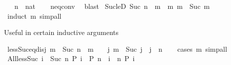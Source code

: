 \begin{isabellebody}
\ \ \ n\ {\isacharcolon}{\kern0pt}{\isacharcolon}{\kern0pt}\ nat\isanewline
%
\isadelimproof
\ \ %
\endisadelimproof
%
\isatagproof
{}\isamarkupfalse%
\ neq{}{\isacharunderscore}{\kern0pt}conv\ \isamarkupfalse%
\ blast%
\endisatagproof
{\isafoldproof}%
%
\isadelimproof
\isanewline
%
\endisadelimproof
\isanewline
{}\isamarkupfalse%
\ Suc{\isacharunderscore}{\kern0pt}le{\isacharunderscore}{\kern0pt}D{\isacharcolon}{\kern0pt}\ {\isachardoublequoteopen}Suc\ n\ {\isasymle}\ m{\isacharprime}{\kern0pt}\ {\isasymLongrightarrow}\ {\isasymexists}m{\isachardot}{\kern0pt}\ m{\isacharprime}{\kern0pt}\ {\isacharequal}{\kern0pt}\ Suc\ m{\isachardoublequoteclose}\isanewline
%
\isadelimproof
\ \ %
\endisadelimproof
%
\isatagproof
{}\isamarkupfalse%
\ {\isacharparenleft}{\kern0pt}induct\ m{\isacharprime}{\kern0pt}{\isacharparenright}{\kern0pt}\ simp{\isacharunderscore}{\kern0pt}all%
\endisatagproof
{\isafoldproof}%
%
\isadelimproof
%
\endisadelimproof
%
\begin{isamarkuptext}%
Useful in certain inductive arguments%
\end{isamarkuptext}\isamarkuptrue%
\isamarkupfalse%
\ less{\isacharunderscore}{\kern0pt}Suc{\isacharunderscore}{\kern0pt}eq{\isacharunderscore}{\kern0pt}{}{\isacharunderscore}{\kern0pt}disj{\isacharcolon}{\kern0pt}\ {\isachardoublequoteopen}m\ {\isacharless}{\kern0pt}\ Suc\ n\ {\isasymlongleftrightarrow}\ m\ {\isacharequal}{\kern0pt}\ {}\ {\isasymor}\ {\isacharparenleft}{\kern0pt}{\isasymexists}j{\isachardot}{\kern0pt}\ m\ {\isacharequal}{\kern0pt}\ Suc\ j\ {\isasymand}\ j\ {\isacharless}{\kern0pt}\ n{\isacharparenright}{\kern0pt}{\isachardoublequoteclose}\isanewline
%
\isadelimproof
\ \ %
\endisadelimproof
%
\isatagproof
{}\isamarkupfalse%
\ {\isacharparenleft}{\kern0pt}cases\ m{\isacharparenright}{\kern0pt}\ simp{\isacharunderscore}{\kern0pt}all%
\endisatagproof
{\isafoldproof}%
%
\isadelimproof
\isanewline
%
\endisadelimproof
\isanewline
{}\isamarkupfalse%
\ All{\isacharunderscore}{\kern0pt}less{\isacharunderscore}{\kern0pt}Suc{\isacharcolon}{\kern0pt}\ {\isachardoublequoteopen}{\isacharparenleft}{\kern0pt}{\isasymforall}i\ {\isacharless}{\kern0pt}\ Suc\ n{\isachardot}{\kern0pt}\ P\ i{\isacharparenright}{\kern0pt}\ {\isacharequal}{\kern0pt}\ {\isacharparenleft}{\kern0pt}P\ n\ {\isasymand}\ {\isacharparenleft}{\kern0pt}{\isasymforall}i\ {\isacharless}{\kern0pt}\ n{\isachardot}{\kern0pt}\ P\ i{\isacharparenright}{\kern0pt}{\isacharparenright}{\kern0pt}{\isachardoublequoteclose}\isanewline

\end{isabellebody}
